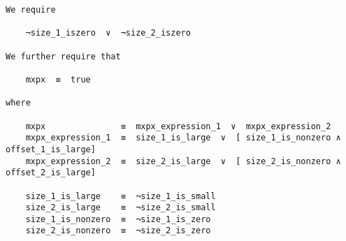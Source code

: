 \documentclass[varwidth=\maxdimen,margin=0.5cm,multi={verbatim}]{standalone}
\begin{document}
\begin{verbatim}
We require

	¬size_1_iszero  ∨  ¬size_2_iszero

We further require that

	mxpx  ≡  true

where

	mxpx               ≡  mxpx_expression_1  ∨  mxpx_expression_2
	mxpx_expression_1  ≡  size_1_is_large  ∨  [ size_1_is_nonzero ∧ offset_1_is_large]
	mxpx_expression_2  ≡  size_2_is_large  ∨  [ size_2_is_nonzero ∧ offset_2_is_large]

	size_1_is_large    ≡  ¬size_1_is_small
	size_2_is_large    ≡  ¬size_2_is_small
	size_1_is_nonzero  ≡  ¬size_1_is_zero
	size_2_is_nonzero  ≡  ¬size_2_is_zero

\end{verbatim}
\end{document}
